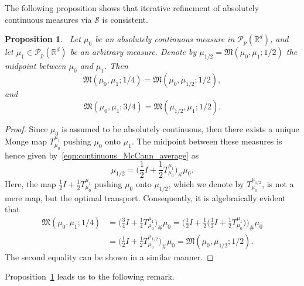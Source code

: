 \documentclass[12pt]{amsart}
\newtheorem{prop}[theorem]{Proposition}
\begin{document}
The following proposition shows that iterative refinement of absolutely continuous measures via $\mathcal{S}$ is consistent.

\begin{prop}~\label{prop:subdivision_closedness}
    Let $\mu_0$ be an absolutely continuous measure in $\mathcal{P}_p(\mathbb{R}^d)$, and let $\mu_1\in\mathcal{P}_p(\mathbb{R}^d)$ be an arbitrary measure. Denote by $\mu_{1/2}=\mathfrak{M}(\mu_0, \mu_1; 1/2)$ the midpoint between $\mu_0$ and $\mu_1$. Then
    \begin{equation*}
        \mathfrak{M}(\mu_0, \mu_1; 1/4) = \mathfrak{M}(\mu_0,\mu_{1/2}; 1/2),
    \end{equation*}
    and
    \begin{equation*}
        \mathfrak{M}(\mu_0, \mu_1; 3/4) = \mathfrak{M}(\mu_{1/2},\mu_1; 1/2).
    \end{equation*}
\end{prop}

\begin{proof}
    Since $\mu_0$ is assumed to be absolutely continuous, then there exists a unique Monge map $T_{\mu_0}^{\mu_1}$ pushing $\mu_0$ onto $\mu_1$. The midpoint between these measures is hence given by~\eqref{eqn:continuous_McCann_average} as
    \begin{equation*}
        \mu_{1/2} = \big(\frac{1}{2}I+\frac{1}{2}T_{\mu_0}^{\mu_1}\big)_{\#}\mu_0.
    \end{equation*}
    Here, the map $\frac{1}{2}I+\frac{1}{2}T_{\mu_0}^{\mu_1}$ pushing $\mu_0$ onto $\mu_{1/2}$, which we denote by $T_{\mu_0}^{\mu_{1/2}}$, is not a mere map, but the optimal transport. Consequently, it is algebraically evident that
    \begin{align*}
        \mathfrak{M}(\mu_0, \mu_1; 1/4) & = \big(\frac{3}{4}I+\frac{1}{4}T_{\mu_0}^{\mu_1}\big)_{\#}\mu_0 = \bigg(\frac{1}{2}I+\frac{1}{2}\big(\frac{1}{2}I+\frac{1}{2}T_{\mu_0}^{\mu_1}\big)\bigg)_{\#}\mu_0
        \\ & = \big(\frac{1}{2}I+\frac{1}{2}T_{\mu_0}^{\mu_{1/2}}\big)_{\#}\mu_0=\mathfrak{M}(\mu_0,\mu_{1/2}; 1/2).
    \end{align*}
    The second equality can be shown in a similar manner.
\end{proof}

Proposition~\ref{prop:subdivision_closedness} leads us to the following remark.
\end{document}
